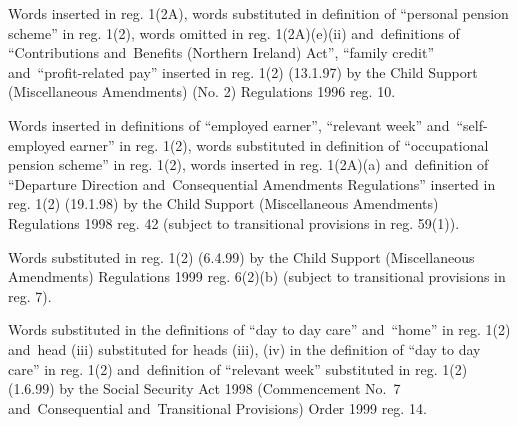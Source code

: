 \documentclass[12pt,a4paper]{article}
\begin{document}
{Words inserted in reg. 1(2A), words substituted in definition of ``personal pension scheme'' in reg. 1(2), words omitted in reg. 1(2A)(e)(ii) and~definitions of ``Contributions and~Benefits (Northern Ireland) Act'', ``family credit'' and~``profit-related pay'' inserted in reg. 1(2) (13.1.97) by the Child Support (Miscellaneous Amendments) (No. 2) Regulations 1996 reg. 10.

Words inserted in definitions of ``employed earner'', ``relevant week'' and~``self-employed earner'' in reg. 1(2), words substituted in definition of ``occupational pension scheme'' in reg. 1(2), words inserted in reg. 1(2A)(a) and~definition of ``Departure Direction and~Consequential Amendments Regulations'' inserted in reg. 1(2) (19.1.98) by the Child Support (Miscellaneous Amendments) Regulations 1998 reg. 42 (subject to transitional provisions in reg. 59(1)).


Words substituted in reg. 1(2) (6.4.99) by the Child Support (Miscellaneous Amendments) Regulations 1999 reg. 6(2)(b) (subject to transitional provisions in reg. 7).

Words substituted in the definitions of ``day to day care'' and~``home'' in reg. 1(2) and~head (iii) substituted for heads (iii), (iv) in the definition of ``day to day care'' in reg. 1(2) and~definition of ``relevant week'' substituted in reg. 1(2) (1.6.99) by the Social Security Act 1998 (Commencement No.\ 7 and~Consequential and~Transitional Provisions) Order 1999 reg. 14.

}
\end{document}
